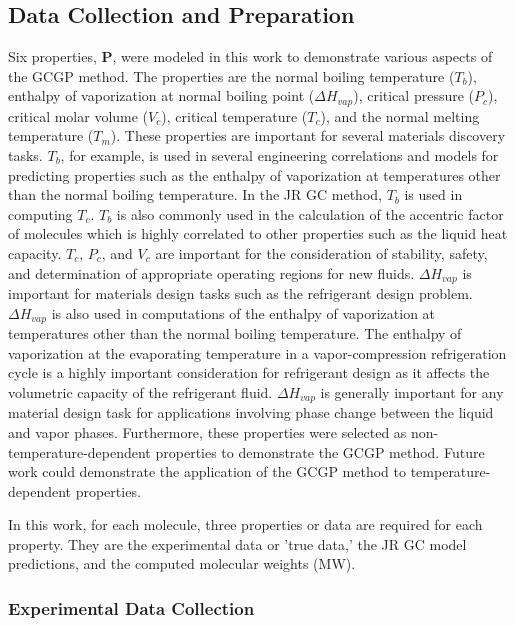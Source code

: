\documentclass[journal=jacsat,manuscript=article]{achemso}
\begin{document}
\subsection{Data Collection and Preparation}

Six properties, \textbf{P}, were modeled in this work to demonstrate various aspects of the GCGP method. The properties are the normal boiling temperature ($T_b$), enthalpy of vaporization at normal boiling point ($\Delta H_{vap}$), critical pressure ($P_c$), critical molar volume ($V_c$), critical temperature ($T_c$), and the normal melting temperature ($T_m$).
These properties are important for several materials discovery tasks. $T_b$, for example, is used in several engineering correlations and models for predicting properties such as the enthalpy of vaporization at temperatures other than the normal boiling temperature. In the JR GC method, $T_b$ is used in computing $T_c$. $T_b$ is also commonly used in the calculation of the accentric factor of molecules which is highly correlated to other properties such as the liquid heat capacity. 
$T_c$, $P_c$, and $V_c$ are important for the consideration of stability, safety, and determination of appropriate operating regions for new fluids. $\Delta H_{vap}$ is important for materials design tasks such as the refrigerant design problem. $\Delta H_{vap}$ is also used in computations of the enthalpy of vaporization at temperatures other than the normal boiling temperature. The enthalpy of vaporization at the evaporating temperature in a vapor-compression refrigeration cycle is a highly important consideration for refrigerant design as it affects the volumetric capacity of the refrigerant fluid. $\Delta H_{vap}$ is generally important for any material design task for applications involving phase change between the liquid and vapor phases.
Furthermore, these properties were selected as non-temperature-dependent properties to demonstrate the GCGP method. Future work could demonstrate the application of the GCGP method to temperature-dependent properties.

In this work, for each molecule, three properties or data are required for each property. They are the experimental data or 'true data,' the JR GC model predictions, and the computed molecular weights (MW).

\subsubsection{Experimental Data Collection}
\end{document}
